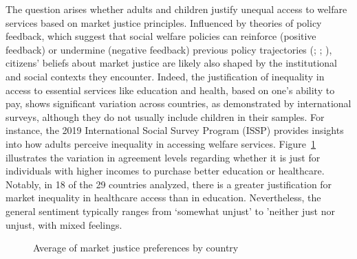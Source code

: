 \documentclass[
  letterpaper,
  DIV=11,
  numbers=noendperiod]{scrartcl}
\begin{document}
The question arises whether adults and children justify unequal access
to welfare services based on market justice principles. Influenced by
theories of policy feedback, which suggest that social welfare policies
can reinforce (positive feedback) or undermine (negative feedback)
previous policy trajectories
(; ;
), citizens' beliefs about
market justice are likely also shaped by the institutional and social
contexts they encounter. Indeed, the justification of inequality in
access to essential services like education and health, based on one's
ability to pay, shows significant variation across countries, as
demonstrated by international surveys, although they do not usually
include children in their samples. For instance, the 2019 International
Social Survey Program (ISSP) provides insights into how adults perceive
inequality in accessing welfare services. Figure~\ref{fig-issp}
illustrates the variation in agreement levels regarding whether it is
just for individuals with higher incomes to purchase better education or
healthcare. Notably, in 18 of the 29 countries analyzed, there is a
greater justification for market inequality in healthcare access than in
education. Nevertheless, the general sentiment typically ranges from
`somewhat unjust' to 'neither just nor unjust, with mixed feelings.

\begin{figure}


\caption{\label{fig-issp}Average of market justice preferences by
country}

\end{figure}%
\end{document}
